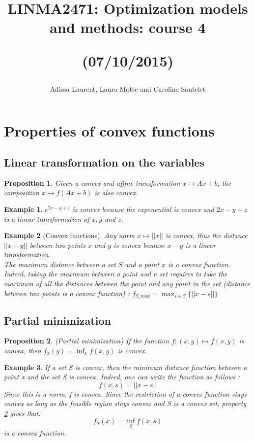 \documentclass[12pt,a4paper]{article}
\title{LINMA2471: Optimization models and methods: course 4 \\
\begin{center}
(07/10/2015)
\end{center}}
\author{Adissa Laurent, Laura Motte and Caroline Sautelet}
\newtheorem{prop}{Proposition}
\newtheorem{exmp}{Example}[section]
\newtheorem{remark}{Remark}
\begin{document}
\maketitle
\section{Properties of convex functions}
\subsection{Linear transformation on the variables}
	\begin{prop}
    Given a convex and affine transformation $ x \mapsto Ax + b $, the composition $x \mapsto f(Ax + b)$ is also convex.
    \end{prop}
    \begin{exmp}
	$e^{2x - y + z}$ is convex because the exponential is convex and  $2x - y + z$ is a linear transformation of $x, y$ and $z$.
	\end{exmp}
    \begin{exmp}[Convex functions]
	Any norm $x \mapsto ||x ||$ is convex, thus the distance $||x-y||$ between two points $x$ and $y$ is convex because $x-y$ is a linear transformation.\\
    The maximum distance between a set $S$ and a point $x$ is a convex function. Indeed, taking the maximum between a point and a set requires to take the maximum of all the distances between the point and any point in the set (distance between two points is a convex function) : $f_{S,max} = \max_{s \in S}\{ ||x - s|| \}$ 
	\end{exmp}
    
    \subsection{Partial minimization}
    
    \begin{prop}\label{partialmin}(Partial minimization)
    If the function $f: (x,y) \mapsto f(x,y) $ is convex, then $f_x (y) = \inf_{x} f(x,y) $ is convex.

\end{prop}
\begin{exmp}
If a set S is convex, then the minimum distance function between a point x and the set S is convex. Indeed, one can write the function as follows :
$$f(x,s) = ||x-s||$$
Since this is a norm, f is convex. Since the restriction of a convex function stays convex as long as the feasible region stays convex and S is a convex set, property \ref{partialmin} gives that:
$$ f_S(x) = \inf_{S} f(x,s)$$ 
is a convex function.
\end{exmp}
    
\end{document}
